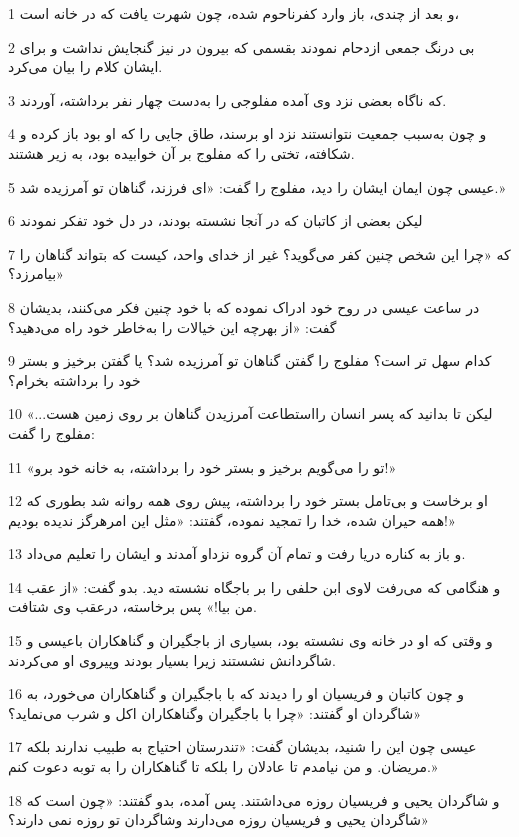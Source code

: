 \par 1 و بعد از چندی، باز وارد کفرناحوم شده، چون شهرت یافت که در خانه است،
\par 2 بی درنگ جمعی ازدحام نمودند بقسمی که بیرون در نیز گنجایش نداشت و برای ایشان کلام را بیان می‌کرد.
\par 3 که ناگاه بعضی نزد وی آمده مفلوجی را به‌دست چهار نفر برداشته، آوردند.
\par 4 و چون به‌سبب جمعیت نتوانستند نزد او برسند، طاق جایی را که او بود باز کرده و شکافته، تختی را که مفلوج بر آن خوابیده بود، به زیر هشتند.
\par 5 عیسی چون ایمان ایشان را دید، مفلوج را گفت: «ای فرزند، گناهان تو آمرزیده شد.»
\par 6 لیکن بعضی از کاتبان که در آنجا نشسته بودند، در دل خود تفکر نمودند
\par 7 که «چرا این شخص چنین کفر می‌گوید؟ غیر از خدای واحد، کیست که بتواند گناهان را بیامرزد؟»
\par 8 در ساعت عیسی در روح خود ادراک نموده که با خود چنین فکر می‌کنند، بدیشان گفت: «از بهر‌چه این خیالات را به‌خاطر خود راه می‌دهید؟
\par 9 کدام سهل تر است؟ مفلوج را گفتن گناهان تو آمرزیده شد؟ یا گفتن برخیز و بستر خود را برداشته بخرام؟
\par 10 لیکن تا بدانید که پسر انسان رااستطاعت آمرزیدن گناهان بر روی زمین هست...» مفلوج را گفت:
\par 11 «تو را می‌گویم برخیز و بستر خود را برداشته، به خانه خود برو!»
\par 12 او برخاست و بی‌تامل بستر خود را برداشته، پیش روی همه روانه شد بطوری که همه حیران شده، خدا را تمجید نموده، گفتند: «مثل این امرهرگز ندیده بودیم!»
\par 13 و باز به کناره دریا رفت و تمام آن گروه نزداو آمدند و ایشان را تعلیم می‌داد.
\par 14 و هنگامی که می‌رفت لاوی ابن حلفی را بر باجگاه نشسته دید. بدو گفت: «از عقب من بیا!» پس برخاسته، درعقب وی شتافت.
\par 15 و وقتی که او در خانه وی نشسته بود، بسیاری از باجگیران و گناهکاران باعیسی و شاگردانش نشستند زیرا بسیار بودند وپیروی او می‌کردند.
\par 16 و چون کاتبان و فریسیان او را دیدند که با باجگیران و گناهکاران می‌خورد، به شاگردان او گفتند: «چرا با باجگیران وگناهکاران اکل و شرب می‌نماید؟»
\par 17 عیسی چون این را شنید، بدیشان گفت: «تندرستان احتیاج به طبیب ندارند بلکه مریضان. و من نیامدم تا عادلان را بلکه تا گناهکاران را به توبه دعوت کنم.»
\par 18 و شاگردان یحیی و فریسیان روزه می‌داشتند. پس آمده، بدو گفتند: «چون است که شاگردان یحیی و فریسیان روزه می‌دارند وشاگردان تو روزه نمی دارند؟»
